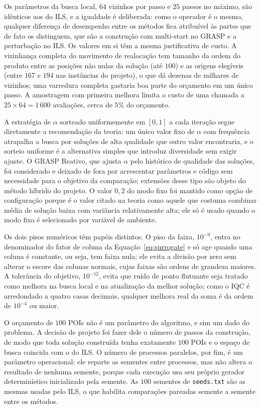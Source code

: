 \documentclass[11pt,a4paper]{article}
\newcommand{\code}[1]{\texttt{#1}}
\begin{document}
Os parâmetros da busca local, $64$ vizinhos por passo e $25$ passos no máximo, são idênticos aos do ILS, e a igualdade é deliberada: como o operador é o mesmo, qualquer diferença de desempenho entre os métodos fica atribuível às partes que de fato os distinguem, que são a construção com multi-start no GRASP e a perturbação no ILS. Os valores em si têm a mesma justificativa de custo. A vizinhança completa do movimento de realocação tem tamanho da ordem do produto entre as posições não nulas da solução (até $100$) e as origens elegíveis (entre $167$ e $194$ nas instâncias do projeto), o que dá dezenas de milhares de vizinhos; uma varredura completa gastaria boa parte do orçamento em um único passo. A amostragem com primeira melhora limita o custo de uma chamada a $25 \times 64 = 1\,600$ avaliações, cerca de $5\%$ do orçamento.

A estratégia de $\alpha$ sorteado uniformemente em $[0,1]$ a cada iteração segue diretamente a recomendação da teoria: um único valor fixo de $\alpha$ com frequência atrapalha a busca por soluções de alta qualidade que outro valor encontraria, e o sorteio uniforme é a alternativa simples que introduz diversidade sem exigir ajuste. O GRASP Reativo, que ajusta $\alpha$ pelo histórico de qualidade das soluções, foi considerado e deixado de fora por acrescentar parâmetros e código sem necessidade para o objetivo da comparação; extensões desse tipo são objeto do método híbrido do projeto. O valor $0{,}2$ do modo fixo foi mantido como opção de configuração porque é o valor citado na teoria como aquele que costuma combinar média de solução baixa com variância relativamente alta; ele só é usado quando o modo fixo é selecionado por variável de ambiente.

Os dois pisos numéricos têm papéis distintos. O piso da faixa, $10^{-9}$, entra no denominador do fator de coluna da Equação~\eqref{eq:surrogate} e só age quando uma coluna é constante, ou seja, tem faixa nula; ele evita a divisão por zero sem alterar o escore das colunas normais, cujas faixas são ordens de grandeza maiores. A tolerância do objetivo, $10^{-12}$, evita que ruído de ponto flutuante seja tratado como melhora na busca local e na atualização da melhor solução; como o IQC é arredondado a quatro casas decimais, qualquer melhora real da soma é da ordem de $10^{-4}$ ou maior.

O orçamento de $100$ POIs não é um parâmetro do algoritmo, e sim um dado do problema. A decisão de projeto foi fazer dele o número de passos da construção, de modo que toda solução construída tenha exatamente $100$ POIs e o espaço de busca coincida com o do ILS. O número de processos paralelos, por fim, é um parâmetro operacional: ele reparte as sementes entre processos, mas não altera o resultado de nenhuma semente, porque cada execução usa seu próprio gerador determinístico inicializado pela semente. As $100$ sementes de \code{seeds.txt} são as mesmas usadas pelo ILS, o que habilita comparações pareadas semente a semente entre os métodos.
\end{document}
